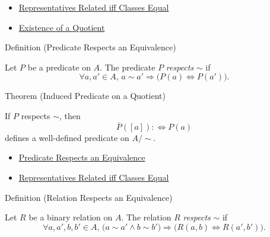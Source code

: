 \begin{dependencies}
\begin{itemize}
  \item \hyperref[prop:representatives-related-iff-classes-equal]{Representatives Related iff Classes Equal}
  \item \hyperref[thm:existence-of-a-quotient]{Existence of a Quotient}
\end{itemize}
\end{dependencies}

\begin{definitionbox}{Definition (Predicate Respects an Equivalence)}
\begin{definition}
\label{def:predicate-respects-equivalence}
Let $P$ be a predicate on $A$. The predicate $P$ \emph{respects} $\sim$ if
\[
\forall a,a'\in A,\,
a\sim a'\Longrightarrow \bigl(P(a)\Longleftrightarrow P(a')\bigr).
\]
\end{definition}
\end{definitionbox}

\begin{theorembox}{Theorem (Induced Predicate on a Quotient)}
\begin{theorem}
\label{thm:induced-predicate-on-quotient}
If $P$ respects $\sim$, then
\[
\overline{P}([a]):\Longleftrightarrow P(a)
\]
defines a well-defined predicate on $A/{\sim}$.
\end{theorem}
\end{theorembox}

\begin{dependencies}
\begin{itemize}
  \item \hyperref[def:predicate-respects-equivalence]{Predicate Respects an Equivalence}
  \item \hyperref[prop:representatives-related-iff-classes-equal]{Representatives Related iff Classes Equal}
\end{itemize}
\end{dependencies}

\begin{definitionbox}{Definition (Relation Respects an Equivalence)}
\begin{definition}
\label{def:relation-respects-equivalence}
Let $R$ be a binary relation on $A$. The relation $R$ \emph{respects} $\sim$
if
\[
\forall a,a',b,b'\in A,\,
\bigl(a\sim a'\land b\sim b'\bigr)
\Longrightarrow
\bigl(R(a,b)\Longleftrightarrow R(a',b')\bigr).
\]
\end{definition}
\end{definitionbox}

